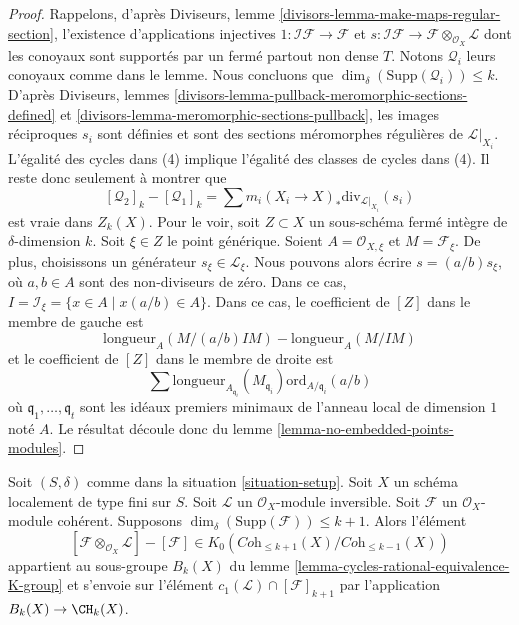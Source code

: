 \begin{proof}
Rappelons, d'après Diviseurs, lemme \ref{divisors-lemma-make-maps-regular-section},
l'existence d'applications injectives
$1 : \mathcal{I}\mathcal{F} \to \mathcal{F}$ et
$s : \mathcal{I}\mathcal{F} \to \mathcal{F} \otimes_{\mathcal{O}_X}\mathcal{L}$
dont les conoyaux sont supportés par un fermé partout non dense $T$.
Notons $\mathcal{Q}_i$ leurs conoyaux comme dans le lemme.
Nous concluons que $\dim_\delta(\text{Supp}(\mathcal{Q}_i)) \leq k$.
D'après Diviseurs, lemmes \ref{divisors-lemma-pullback-meromorphic-sections-defined}
et \ref{divisors-lemma-meromorphic-sections-pullback}, les images réciproques $s_i$
sont définies et sont des sections méromorphes régulières de $\mathcal{L}|_{X_i}$.
L'égalité des cycles dans (4) implique l'égalité des classes de cycles
dans (4). Il reste donc seulement à montrer que
$$
[\mathcal{Q}_2]_k - [\mathcal{Q}_1]_k
=
\sum m_i(X_i \to X)_*\text{div}_{\mathcal{L}|_{X_i}}(s_i)
$$
est vraie dans $Z_k(X)$. Pour le voir, soit $Z \subset X$ un sous-schéma fermé intègre
de $\delta$-dimension $k$. Soit $\xi \in Z$ le point générique.
Soient $A = \mathcal{O}_{X, \xi}$ et $M = \mathcal{F}_\xi$.
De plus, choisissons un générateur $s_\xi \in \mathcal{L}_\xi$.
Nous pouvons alors écrire $s = (a/b) s_\xi$, où $a, b \in A$ sont des
non-diviseurs de zéro. Dans ce cas,
$I = \mathcal{I}_\xi = \{x \in A \mid x(a/b) \in A\}$.
Dans ce cas, le coefficient de $[Z]$ dans le membre de gauche est
$$
\text{longueur}_A(M/(a/b)IM) - \text{longueur}_A(M/IM)
$$
et le coefficient de $[Z]$ dans le membre de droite
est
$$
\sum
\text{longueur}_{A_{\mathfrak q_i}}(M_{\mathfrak q_i})
\text{ord}_{A/\mathfrak q_i}(a/b)
$$
où $\mathfrak q_1, \ldots, \mathfrak q_t$ sont les idéaux premiers minimaux
de l'anneau local de dimension $1$ noté $A$. Le résultat
découle donc du lemme \ref{lemma-no-embedded-points-modules}.
\end{proof}

\begin{lemma}
\label{lemma-coherent-sheaf-cap-c1}
Soit $(S, \delta)$ comme dans la situation \ref{situation-setup}.
Soit $X$ un schéma localement de type fini sur $S$.
Soit $\mathcal{L}$ un $\mathcal{O}_X$-module inversible.
Soit $\mathcal{F}$ un $\mathcal{O}_X$-module cohérent.
Supposons $\dim_\delta(\text{Supp}(\mathcal{F})) \leq k + 1$.
Alors l'élément
$$
[\mathcal{F} \otimes_{\mathcal{O}_X} \mathcal{L}]
-
[\mathcal{F}]
\in
K_0(\textit{Coh}_{\leq k + 1}(X)/\textit{Coh}_{\leq k - 1}(X))
$$
appartient au sous-groupe $B_k(X)$ du
lemme \ref{lemma-cycles-rational-equivalence-K-group} et s'envoie sur
l'élément $c_1(\mathcal{L}) \cap [\mathcal{F}]_{k + 1}$ par
l'application $B_k(X) \to \CH_k(X)$.
\end{lemma}


